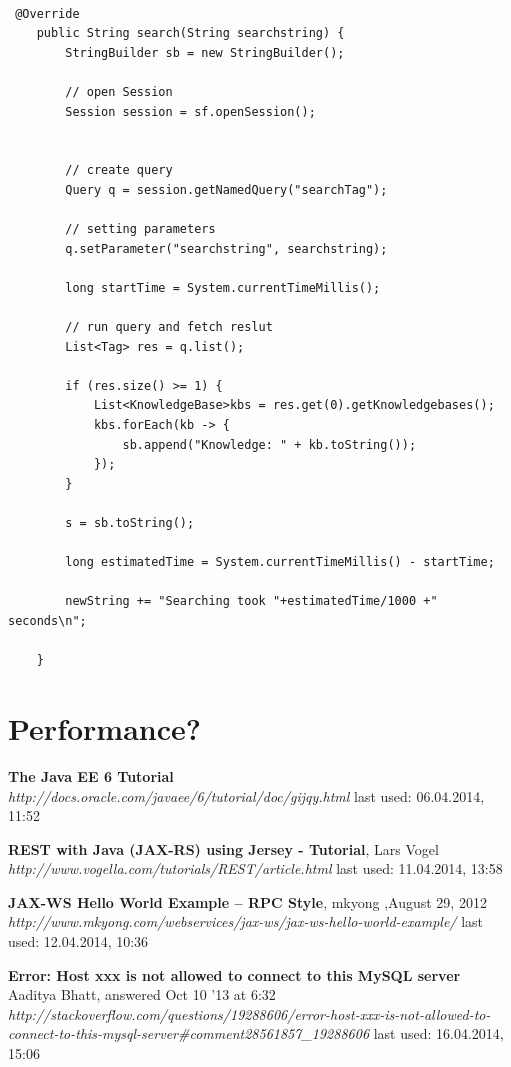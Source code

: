 \documentclass[12pt]{article}
\begin{document}
\begin{lstlisting}[caption=Search method of the Service, label=generateEntry]

 @Override
    public String search(String searchstring) {
        StringBuilder sb = new StringBuilder();

        // open Session
        Session session = sf.openSession();


        // create query
        Query q = session.getNamedQuery("searchTag");

        // setting parameters
        q.setParameter("searchstring", searchstring);

        long startTime = System.currentTimeMillis();

        // run query and fetch reslut
        List<Tag> res = q.list();

        if (res.size() >= 1) {
            List<KnowledgeBase>kbs = res.get(0).getKnowledgebases();
            kbs.forEach(kb -> {
                sb.append("Knowledge: " + kb.toString());
            });
        }
        
        s = sb.toString();

        long estimatedTime = System.currentTimeMillis() - startTime;

        newString += "Searching took "+estimatedTime/1000 +" seconds\n";

    }
    \end{lstlisting}
\section{Performance?}

\newpage
\begin{thebibliography}{56}

   \textbf{The Java EE 6 Tutorial} \\
  \textit{http://docs.oracle.com/javaee/6/tutorial/doc/gijqy.html}
  \newline last used: 06.04.2014, 11:52
  
   \textbf{REST with Java (JAX-RS) using Jersey - Tutorial}, Lars Vogel\\
  \textit{  http://www.vogella.com/tutorials/REST/article.html}
  \newline last used: 11.04.2014, 13:58
  
    
   \textbf{JAX-WS Hello World Example – RPC Style}, mkyong ,August 29, 2012\\
  \textit{  http://www.mkyong.com/webservices/jax-ws/jax-ws-hello-world-example/}
  \newline last used: 12.04.2014, 10:36
  
   \textbf{Error: Host xxx is not allowed to connect to this MySQL server}\\ Aaditya Bhatt, answered Oct 10 '13 at 6:32\\
  \textit{   http://stackoverflow.com/questions/19288606/error-host-xxx-is-not-allowed-to-connect-to-this-mysql-server\#comment28561857\_19288606
}
  \newline last used: 16.04.2014, 15:06
  

\end{thebibliography}
\end{document}
